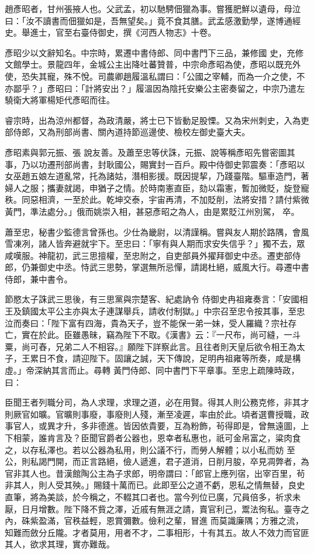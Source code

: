 \begin{pinyinscope}
 趙彥昭者，甘州張掖人也。父武孟，初以馳騁佃獵為事。嘗獲肥鮮以遺母，母泣曰：「汝不讀書而佃獵如是，吾無望矣。」竟不食其膳。武孟感激勤學，遂博通經史。舉進士，官至右臺侍御史，撰《河西人物志》十卷。



 彥昭少以文辭知名。中宗時，累遷中書侍郎、同中書門下三品，兼修國
 史，充修文館學士。景龍四年，金城公主出降吐蕃贊普，中宗命彥昭為使，彥昭以既充外使，恐失其寵，殊不悅。司農卿趙履溫私謂曰：「公國之宰輔，而為一介之使，不亦鄙乎？」彥昭曰：「計將安出？」履溫因為陰托安樂公主密奏留之，中宗乃遣左驍衛大將軍楊矩代彥昭而往。



 睿宗時，出為涼州都督，為政清嚴，將士已下皆動足股慄。又為宋州刺史，入為吏部侍郎，又為刑部尚書、關內道持節巡邊使、檢校左御史臺大夫。



 彥昭素與郭元振、張
 說友善。及蕭至忠等伏誅，元振、說等稱彥昭先嘗密圖其事，乃以功遷刑部尚書，封耿國公，賜實封一百戶。殿中侍御史郭震奏：「彥昭以女巫趙五娘左道亂常，托為諸姑，潛相影援。既因提挈，乃踐臺階。驅車造門，著婦人之服；攜妻就謁，申猶子之情。於時南憲直臣，劾以霜憲，暫加微貶，旋登寵秩。同惡相濟，一至於此。乾坤交泰，宇宙再清，不加貶削，法將安措？請付紫微黃門，準法處分。」俄而姚崇入相，甚惡彥昭之為人，由是累貶江州別駕，
 卒。



 蕭至忠，秘書少監德言曾孫也。少仕為畿尉，以清謹稱。嘗與友人期於路隅，會風雪凍冽，諸人皆奔避就宇下。至忠曰：「寧有與人期而求安失信乎？」獨不去，眾咸嘆服。神龍初，武三思擅權，至忠附之，自吏部員外擢拜御史中丞。遷吏部侍郎，仍兼御史中丞。恃武三思勢，掌選無所忌憚，請謁杜絕，威風大行。尋遷中書侍郎，兼中書令。



 節愍太子誅武三思後，有三思黨與宗楚客、紀處訥令
 侍御史冉祖雍奏言：「安國相王及鎮國太平公主亦與太子連謀舉兵，請收付制獄。」中宗召至忠令按其事，至忠泣而奏曰：「陛下富有四海，貴為天子，豈不能保一弟一妹，受人羅織？宗社存亡，實在於此。臣雖愚昧，竊為陛下不取。《漢書》云：『一尺布，尚可縫，一斗粟，尚可舂，兄弟二人不相容。』願陛下詳察此言。且往者則天皇后欲令相王為太子，王累日不食，請迎陛下。固讓之誠，天下傳說，足明冉祖雍等所奏，咸是構虛。」帝深納其言而止。尋轉
 黃門侍郎、同中書門下平章事。至忠上疏陳時政，曰：



 臣聞王者列職分司，為人求理，求理之道，必在用賢。得其人則公務克修，非其才則厥官如曠。官曠則事廢，事廢則人殘，漸至凌遲，率由於此。頃者選曹授職，政事官人，或異才升，多非德進。皆因依貴要，互為粉飾，茍得即是，曾無遠圖，上下相蒙，誰肯言及？臣聞官爵者公器也，恩幸者私惠也，祇可金帛富之，粱肉食之，以存私澤也。若以公器為私用，則公議不行，而勞人解體；以小私而妨
 至公，則私謁門開，而正言路絕，儉人遞進，君子道消，日削月朘，卒見凋弊者，為官非其人也。昔漢館陶公主為子求郎，明帝謂曰：「郎官上應列宿，出宰百里，茍非其人，則人受其殃。」賜錢十萬而已。此即至公之道不虧，恩私之情無替，良史直筆，將為美談，於今稱之，不輟其口者也。當今列位已廣，冗員倍多，祈求未厭，日月增數。陛下降不貲之澤，近戚有無涯之請，賣官利己，鬻法徇私。臺寺之內，硃紫盈滿，官秩益輕，恩賞彌數。儉利之輩，冒進
 而莫識廉隅；方雅之流，知難而斂分丘隴。才者莫用，用者不才，二事相形，十有其五。故人不效力而官匪其人，欲求其理，實亦難哉。




\end{pinyinscope}
